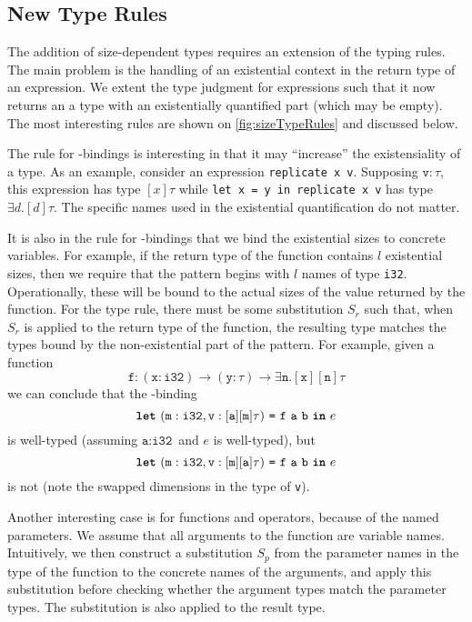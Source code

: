 \subsection{New Type Rules}

The addition of size-dependent types requires an extension of the
typing rules.  The main problem is the handling of an existential
context in the return type of an expression.  We extent the type
judgment for expressions such that it now returns an a type with an
existentially quantified part (which may be empty).  The most
interesting rules are shown on \cref{fig:sizeTypeRules} and discussed
below.

The rule for -bindings is interesting in that it may
``increase'' the existensiality of a type.  As an example, consider an
expression \lstinline{replicate x v}.  Supposing $\texttt{v}: \tau$,
this expression has type $[x]\tau$ %
while \mbox{\lstinline{let x = y in replicate x v}} has type
$\exists d.[d]\tau$.  The specific names used in the existential
quantification do not matter.

It is also in the rule for -bindings that we bind the
existential sizes to concrete variables.  For example, if the return
type of the function contains $l$ existential sizes, then we require
that the pattern begins with $l$ names of type \texttt{i32}.
Operationally, these will be bound to the actual sizes of the value
returned by the function.  For the type rule, there must be some
substitution $S_{r}$ such that, when $S_{r}$ is applied to the return
type of the function, the resulting type matches the types bound by
the non-existential part of the pattern.  For example, given a
function
\[
  \texttt{f}: (\texttt{x}: \texttt{i32}) \rightarrow (\texttt{y}: \tau) \rightarrow \exists \texttt{n}.[\texttt{x}][\texttt{n}]\tau
\]
we can conclude that the -binding
\[
\mbox{\texttt{\bfseries{let}}}~(\texttt{m}: \texttt{i32}, \texttt{v}: [\texttt{a}][\texttt{m}]\tau)~\mbox{\texttt{=}}~\texttt{f}~\texttt{a}~\texttt{b}~\mbox{\texttt{\bfseries{in}}}~e
\]
is well-typed (assuming $\texttt{a}: \texttt{i32}$ and $e$ is
well-typed), but
\[
\mbox{\texttt{\bfseries{let}}}~(\texttt{m}: \texttt{i32}, \texttt{v}: [\texttt{m}][\texttt{a}]\tau)~\mbox{\texttt{=}}~\texttt{f}~\texttt{a}~\texttt{b}~\mbox{\texttt{\bfseries{in}}}~e
\]
is not (note the swapped dimensions in the type of \texttt{v}).

Another interesting case is for functions and operators, because of
the named parameters.  We assume that all arguments to the function
are variable names.  Intuitively, we then construct a substitution
$S_{p}$ from the parameter names in the type of the function to the
concrete names of the arguments, and apply this substitution before
checking whether the argument types match the parameter types.  The
substitution is also applied to the result type.

